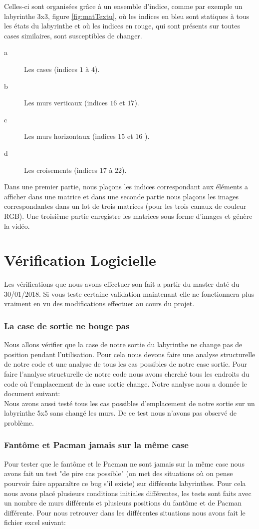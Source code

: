  Celles-ci sont organisées grâce à un ensemble d'indice, comme par exemple un labyrinthe 3x3, figure \ref{fig:matTextu}, où les indices en bleu sont statiques à tous les états du labyrinthe et où les indices en rouge, qui sont présents sur toutes cases similaires, sont susceptibles de changer. 
 \begin{description}
 \item[a] Les cases (indices $1$ à $4$).
 \item[b] Les murs verticaux (indices $16$ et $17$).
 \item[c] Les murs horizontaux (indices $15$ et $16$ ).
 \item[d] Les croisements (indices $17$ à $22$).
 \end{description}
 Dans une premier partie, nous plaçons les indices correspondant aux éléments a afficher dans une matrice et dans une seconde partie nous plaçons les images correspondantes dans un lot de trois matrices (pour les trois canaux de couleur RGB). Une troisième partie enregistre les matrices sous forme d'images et génère la vidéo.

 \section{Vérification Logicielle}
Les vérifications que nous avons effectuer son fait a partir du master daté du 30/01/2018. Si vous teste certaine validation maintenant elle ne fonctionnera plus vraiment en vu des modifications effectuer au cours du projet. 
\subsubsection{La case de sortie ne bouge pas}
Nous allons vérifier que la case de notre sortie du labyrinthe ne change pas de position pendant l'utilisation. Pour cela nous devons faire une analyse structurelle de notre code et une analyse de tous les cas possibles de notre case sortie. Pour faire l'analyse structurelle de notre code nous avons cherché tous les endroits du code où l'emplacement de la case sortie change. Notre analyse nous a donnée le document suivant:\\
Nous avons aussi testé tous les cas possibles d'emplacement de notre sortie sur un labyrinthe 5x5 sans changé les murs. De ce test nous n'avons pas observé de problème.

\subsubsection{Fantôme et Pacman jamais sur la même case}
Pour tester que le fantôme et le Pacman ne sont jamais sur la même case nous avons fait un test "de pire cas possible" (on met des situations où on pense pourvoir faire apparaître ce bug s'il existe) sur différents labyrinthes. Pour cela nous avons placé plusieurs conditions initiales différentes, les tests sont faits avec un nombre de murs différents et plusieurs positions du fantôme et de Pacman différente. Pour nous retrouver dans les différentes situations nous avons fait le fichier excel suivant:\\


